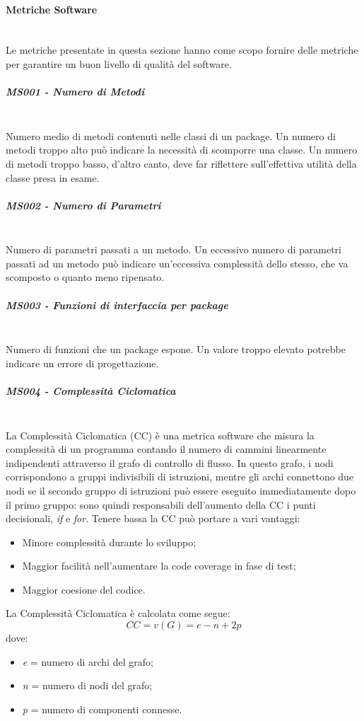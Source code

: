 \paragraph{Metriche Software}\mbox{}\\
Le metriche presentate in questa sezione hanno come scopo fornire delle metriche per garantire un buon livello di qualità del software.
\subparagraph{MS001 - Numero di Metodi}\mbox{}\\
Numero medio di metodi contenuti nelle classi di un package. Un numero di metodi troppo alto può indicare la necessità di scomporre una classe. Un numero di metodi troppo basso, d'altro canto, deve far riflettere sull'effettiva utilità della classe presa in esame.
\subparagraph{MS002 - Numero di Parametri}\mbox{}\\
Numero di parametri passati a un metodo. Un eccessivo numero di parametri passati ad un metodo può indicare un'eccessiva complessità dello stesso, che va scomposto o quanto meno ripensato.
\subparagraph{MS003 - Funzioni di interfaccia per package}\mbox{}\\
Numero di funzioni che un package espone. Un valore troppo elevato potrebbe indicare un errore di progettazione.
\subparagraph{MS004 - Complessità Ciclomatica}\mbox{}\\
La Complessità Ciclomatica (CC) è una metrica software che misura la complessità di un programma contando il numero di cammini linearmente indipendenti attraverso il grafo di controllo di flusso. In questo grafo, i nodi corrispondono a gruppi indivisibili di istruzioni, mentre gli archi connettono due nodi se il secondo gruppo di istruzioni può essere eseguito immediatamente dopo il primo gruppo: sono quindi responsabili dell'aumento della CC i punti decisionali, \emph{if} e \emph{for}.
Tenere bassa la CC può portare a vari vantaggi:
\begin{itemize}
	\item Minore complessità durante lo sviluppo;
	\item Maggior facilità nell'aumentare la code coverage in fase di test;
	\item Maggior coesione del codice.
\end{itemize}
La Complessità Ciclomatica è calcolata come segue:
\[
CC = v(G) = e - n + 2p
\]
dove:
\begin{itemize}
	\item \emph{e} = numero di archi del grafo;
	\item \emph{n} = numero di nodi del grafo;
	\item \emph{p} = numero di componenti connesse.
\end{itemize}
